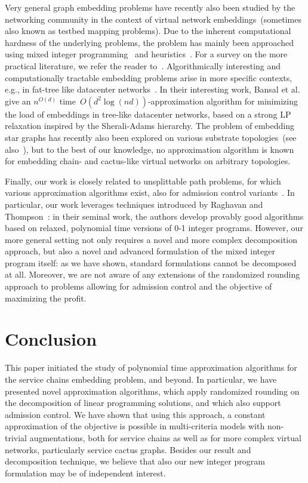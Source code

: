 \documentclass[10pt, conference, letterpaper]{IEEEtran}
\begin{document}
Very general graph embedding problems have recently also 
been studied by the networking community
in the context of virtual network embeddings~(sometimes
also known as testbed mapping problems).
Due to the inherent computational hardness of the underlying
problems, the problem has mainly been approached using mixed integer
programming~\cite{vnep} and heuristics~\cite{vnep-rethink}.
For a survey on the more practical literature, we refer
the reader to~\cite{vnep-survey}.
Algorithmically interesting and computationally tractable embedding problems
arise in more specific contexts, e.g., 
in fat-tree like datacenter networks~\cite{oktopus,ccr15emb}.
In their interesting work, 
Bansal et al.~\cite{bansal2011minimum} 
give an
$n^{O(d)}$ time~$O(d^2 \log{(nd)})$-approximation algorithm 
for minimizing the load of embeddings in tree-like datacenter
networks, based on a strong LP relaxation
inspired by the Sherali-Adams hierarchy.
The problem of embedding star graphs 
has recently also been explored on various substrate topologies~(see also~\cite{ccr15emb}),
but to the best of our knowledge, no approximation algorithm
is known for embedding chain- and cactus-like virtual networks on arbitrary topologies.


Finally, our work is closely related to unsplittable
path problems, for which various approximation algorithms
exist,
also for admission control variants~\cite{Kleinberg-admission-control}.
In particular, our work leverages  
techniques introduced by Raghavan and Thompson~\cite{Raghavan-Thompson}:
in their seminal work, the authors 
develop provably
good algorithms based on relaxed, polynomial time versions of 
0-1 integer programs. 
However, our more general setting not only requires a novel
and more complex decomposition approach,   but also a novel and advanced
formulation of the mixed integer program itself: as we have shown, 
standard formulations cannot be decomposed at all.
Moreover, we are not aware of any extensions of the randomized rounding
approach to problems allowing for admission control and the objective of maximizing the profit. 



\section{Conclusion}\label{sec:conclusion}

This paper initiated the study of 
polynomial time approximation algorithms
for the service chains embedding problem, and beyond. 
In particular, we have presented novel approximation algorithms,
which apply randomized rounding on the decomposition of linear programming solutions, and which also support admission control. 
We have shown that using this approach, a constant approximation of the objective
is possible in multi-criteria models with non-trivial augmentations, both for
service chains as well as for more complex virtual networks, particularly
service cactus graphs.
Besides our result and decomposition technique,
we believe that also our new integer program formulation may be of independent interest.
\end{document}
